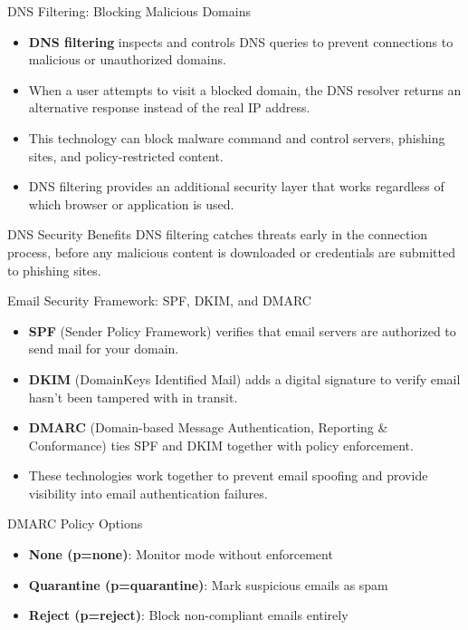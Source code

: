 \documentclass{beamer}
\begin{document}
\begin{frame}{DNS Filtering: Blocking Malicious Domains}
\begin{itemize}
\item \textbf{DNS filtering} inspects and controls DNS queries to prevent connections to malicious or unauthorized domains.
\item When a user attempts to visit a blocked domain, the DNS resolver returns an alternative response instead of the real IP address.
\item This technology can block malware command and control servers, phishing sites, and policy-restricted content.
\item DNS filtering provides an additional security layer that works regardless of which browser or application is used.
\end{itemize}

\begin{alertblock}{DNS Security Benefits}
DNS filtering catches threats early in the connection process, before any malicious content is downloaded or credentials are submitted to phishing sites.
\end{alertblock}
\end{frame}

\begin{frame}{Email Security Framework: SPF, DKIM, and DMARC}
\begin{itemize}
\item \textbf{SPF} (Sender Policy Framework) verifies that email servers are authorized to send mail for your domain.
\item \textbf{DKIM} (DomainKeys Identified Mail) adds a digital signature to verify email hasn't been tampered with in transit.
\item \textbf{DMARC} (Domain-based Message Authentication, Reporting \& Conformance) ties SPF and DKIM together with policy enforcement.
\item These technologies work together to prevent email spoofing and provide visibility into email authentication failures.
\end{itemize}

\begin{block}{DMARC Policy Options}
\begin{itemize}
\item \textbf{None (p=none)}: Monitor mode without enforcement
\item \textbf{Quarantine (p=quarantine)}: Mark suspicious emails as spam
\item \textbf{Reject (p=reject)}: Block non-compliant emails entirely
\end{itemize}
\end{block}
\end{frame}
\end{document}
